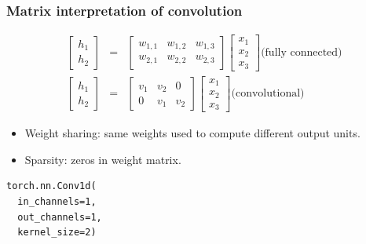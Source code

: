 \documentclass{beamer}
\begin{document}
\begin{frame}[fragile]
  \frametitle{Matrix interpretation of convolution}
  \begin{eqnarray*}
  \begin{bmatrix}
    h_1 \\
    h_2 
  \end{bmatrix}
    &=&
  \begin{bmatrix}
    w_{1,1} & w_{1,2} & w_{1,3} \\
    w_{2,1} & w_{2,2} & w_{2,3}
  \end{bmatrix}
  \begin{bmatrix}
    x_1 \\
    x_2 \\
    x_3
  \end{bmatrix} \text{(fully connected)}
    \\
  \begin{bmatrix}
    h_1 \\
    h_2 
  \end{bmatrix}
    &=&
  \begin{bmatrix}
    v_{1} & v_{2} & 0 \\
    0 & v_{1} & v_{2}
  \end{bmatrix}
  \begin{bmatrix}
    x_1 \\
    x_2 \\
    x_3
  \end{bmatrix} \text{(convolutional)}
  \end{eqnarray*}
  \begin{itemize}
  \item Weight sharing: same weights used to compute different
    output units.
  \item Sparsity: zeros in weight matrix.
  \end{itemize}

\begin{verbatim}
torch.nn.Conv1d(
  in_channels=1, 
  out_channels=1,
  kernel_size=2)
\end{verbatim}
  
\end{frame}
\end{document}
